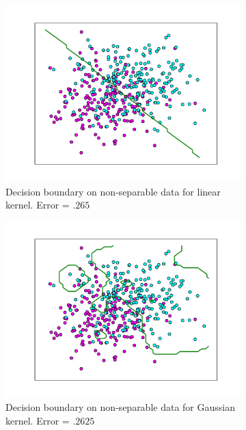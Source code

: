\documentclass[10pt]{article}
\begin{document}
\begin{figure}[!ht]
\begin{subfigure}[t]{0.46\textwidth}
	\centering
	\includegraphics[width=\textwidth]{exercise2-3-stdev4-linear.pdf}
	\caption{Decision boundary on non-separable data for linear kernel. Error = $.265$}
	\label{fig:2-3-linear}
\end{subfigure}
\begin{subfigure}[t]{0.46\textwidth}
	\centering
	\includegraphics[width=\textwidth]{exercise2-3-stdev4-gaussian.pdf}
	\caption{Decision boundary on non-separable data for Gaussian kernel. Error = $.2625$}
	\label{fig:2-3-gaussian}
\end{subfigure}
\caption{}
\label{fig:2-3-all}
\end{figure}
\end{document}
